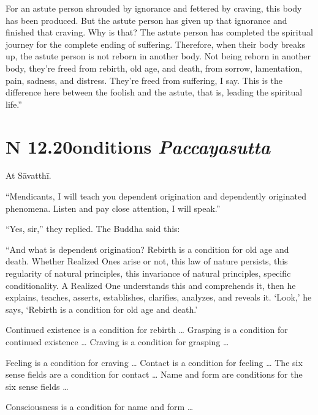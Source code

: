 \documentclass[12pt,openany]{book}%
\newcommand*{\suttatitleacronym}[1]{\smaller[2]{#1}\vspace*{.3em}}
\newcommand*{\suttatitletranslation}[1]{\linebreak{#1}}
\newcommand*{\suttatitleroot}[1]{\linebreak\smaller[2]\itshape{#1}}
\newcommand*{\tocacronym}[1]{\hspace*{-3.3em}{#1}\quad}
\newcommand*{\toctranslation}[1]{#1}
\newcommand*{\tocroot}[1]{(\textit{#1})}
\begin{document}
For an astute person shrouded by ignorance and fettered by craving, this body has been produced. But the astute person has given up that ignorance and finished that craving. Why is that? The astute person has completed the spiritual journey for the complete ending of suffering. Therefore, when their body breaks up, the astute person is not reborn in another body. Not being reborn in another body, they’re freed from rebirth, old age, and death, from sorrow, lamentation, pain, sadness, and distress. They’re freed from suffering, I say. This is the difference here between the foolish and the astute, that is, leading the spiritual life.” 

%
\section*{{\suttatitleacronym SN 12.20}{\suttatitletranslation Conditions }{\suttatitleroot Paccayasutta}}
\addcontentsline{toc}{section}{\tocacronym{SN 12.20} \toctranslation{Conditions } \tocroot{Paccayasutta}}

At \textsanskrit{Sāvatthī}. 

“Mendicants, I will teach you dependent origination and dependently originated phenomena. Listen and pay close attention, I will speak.” 

“Yes, sir,” they replied. The Buddha said this: 

“And what is dependent origination? Rebirth is a condition for old age and death. Whether Realized Ones arise or not, this law of nature persists, this regularity of natural principles, this invariance of natural principles, specific conditionality. A Realized One understands this and comprehends it, then he explains, teaches, asserts, establishes, clarifies, analyzes, and reveals it. ‘Look,’ he says, ‘Rebirth is a condition for old age and death.’ 

Continued existence is a condition for rebirth … Grasping is a condition for continued existence … Craving is a condition for grasping … 

Feeling is a condition for craving … Contact is a condition for feeling … The six sense fields are a condition for contact … Name and form are conditions for the six sense fields … 

Consciousness is a condition for name and form … 
\end{document}
